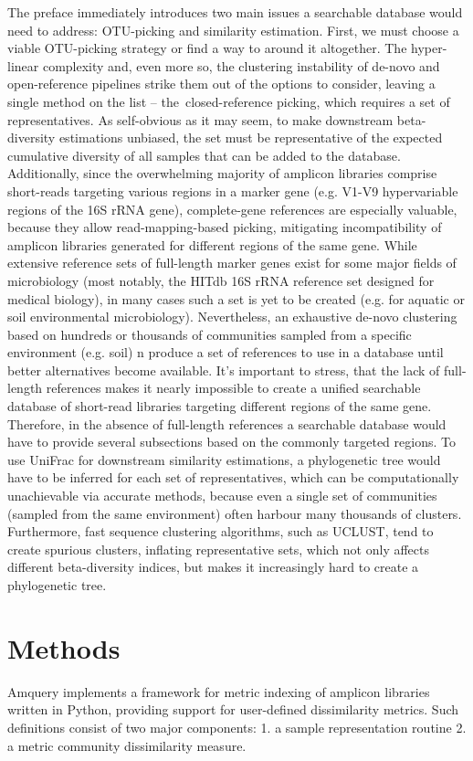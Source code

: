 \documentclass[10pt,letterpaper]{article}
\begin{document}
The preface immediately introduces two main issues a searchable database would need to address: OTU-picking and 
similarity estimation. First, we must choose a viable OTU-picking strategy or find a way to around it altogether. 
The hyper-linear complexity and, even more so, the clustering instability of de-novo and open-reference pipelines 
strike them out of the options to consider, leaving a single method on the list – the closed-reference picking, 
which requires a set of representatives. As self-obvious as it may seem, to make downstream beta-diversity estimations 
unbiased, the set must be representative of the expected cumulative diversity of all samples that can be added to the 
database. Additionally, since the overwhelming majority of amplicon libraries comprise short-reads targeting various 
regions in a marker gene (e.g. V1-V9 hypervariable regions of the 16S rRNA gene), complete-gene references are especially 
valuable, because they allow read-mapping-based picking, mitigating incompatibility of amplicon libraries generated 
for different regions of the same gene. While extensive reference sets of full-length marker genes exist for some 
major fields of microbiology (most notably, the HITdb 16S rRNA reference set designed for medical biology), in many 
cases such a set is yet to be created (e.g. for aquatic or soil environmental microbiology). Nevertheless, an 
exhaustive de-novo clustering based on hundreds or thousands of communities sampled from a specific environment (e.g. soil) 
n produce a set of references to use in a database until better alternatives become available. It’s important to stress, 
that the lack of full-length references makes it nearly impossible to create a unified searchable database of 
short-read libraries targeting different regions of the same gene. Therefore, in the absence of full-length 
references a searchable database would have to provide several subsections based on the commonly targeted regions. 
To use UniFrac for downstream similarity estimations, a phylogenetic tree would have to be inferred for each set of 
representatives, which can be computationally unachievable via accurate methods, because even a single set of 
communities (sampled from the same environment) often harbour many thousands of clusters. Furthermore, fast sequence 
clustering algorithms, such as UCLUST, tend to create spurious clusters, inflating representative sets, which not only 
affects different beta-diversity indices, but makes it increasingly hard to create a phylogenetic tree.


\section*{Methods}
Amquery implements a framework for metric indexing of amplicon libraries written in Python, 
providing support for user-defined dissimilarity metrics. Such definitions consist of two major components:
1. a sample representation routine
2. a metric community dissimilarity measure.
\end{document}
